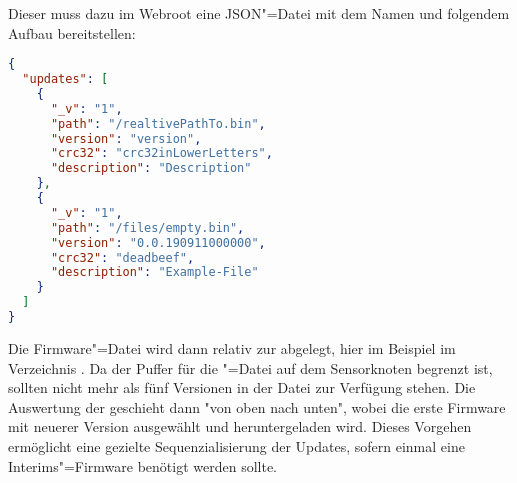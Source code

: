 Dieser muss dazu im Webroot eine JSON"=Datei mit dem Namen  und folgendem Aufbau bereitstellen:
\begin{lstlisting}[language=json]
{
  "updates": [
    {
      "_v": "1",
      "path": "/realtivePathTo.bin",
      "version": "version",
      "crc32": "crc32inLowerLetters",
      "description": "Description"
    },
    {
      "_v": "1",
      "path": "/files/empty.bin",
      "version": "0.0.190911000000",
      "crc32": "deadbeef",
      "description": "Example-File"
    }
  ]
}
\end{lstlisting}

Die Firmware"=Datei wird dann relativ zur  abgelegt, hier im Beispiel im Verzeichnis .
Da der Puffer für die "=Datei auf dem Sensorknoten begrenzt ist, sollten nicht mehr als fünf Versionen in der Datei zur Verfügung stehen.
Die Auswertung der  geschieht dann "von oben nach unten", wobei die erste Firmware mit neuerer Version ausgewählt und heruntergeladen wird.
Dieses Vorgehen ermöglicht eine gezielte Sequenzialisierung der Updates, sofern einmal eine Interims"=Firmware benötigt werden sollte. 
